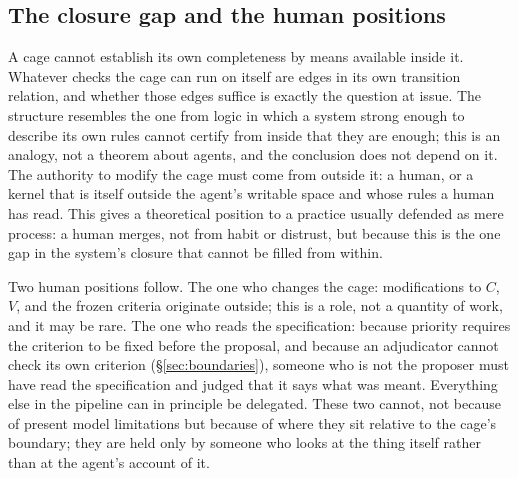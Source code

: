 \subsection{The closure gap and the human positions}
\label{sec:closure}

A cage cannot establish its own completeness by means available inside it. Whatever checks the cage can run on itself are edges in its own transition relation, and whether those edges suffice is exactly the question at issue. The structure resembles the one from logic in which a system strong enough to describe its own rules cannot certify from inside that they are enough; this is an analogy, not a theorem about agents, and the conclusion does not depend on it. The authority to modify the cage must come from outside it: a human, or a kernel that is itself outside the agent's writable space and whose rules a human has read. This gives a theoretical position to a practice usually defended as mere process: a human merges, not from habit or distrust, but because this is the one gap in the system's closure that cannot be filled from within.

Two human positions follow. The one who changes the cage: modifications to $C$, $V$, and the frozen criteria originate outside; this is a role, not a quantity of work, and it may be rare. The one who reads the specification: because priority requires the criterion to be fixed before the proposal, and because an adjudicator cannot check its own criterion (\S\ref{sec:boundaries}), someone who is not the proposer must have read the specification and judged that it says what was meant. Everything else in the pipeline can in principle be delegated. These two cannot, not because of present model limitations but because of where they sit relative to the cage's boundary; they are held only by someone who looks at the thing itself rather than at the agent's account of it.
